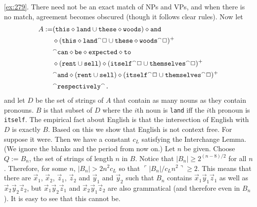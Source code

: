 \eqref{ex:279}. There need not be an exact match of NPs and 
VPs, and when there is no match, agreement becomes obscured (though 
it follows clear rules). Now let 
\begin{align}
A := & (\mbox{\tt this}\diamond \mbox{\tt land} \cup \mbox{\tt these}
	\diamond \mbox{\tt woods})\diamond \mbox{\tt and} \\\notag
& \diamond (\mbox{\tt this}\diamond\mbox{\tt land}{^{\smallfrown}}\Box \cup 
	\mbox{\tt these}\diamond\mbox{\tt woods}{^{\smallfrown}}\Box)^+ \\\notag 
	& {^{\smallfrown}} \mbox{\tt can}\diamond\mbox{\tt be}\diamond\mbox{\tt expected}
	\diamond\mbox{\tt to} \\\notag
	& \diamond (\mbox{\tt rent} \cup \mbox{\tt sell})\diamond
	(\mbox{\tt itself}{^{\smallfrown}}\Box \cup 
	\mbox{\tt themselves}{^{\smallfrown}}\Box)^+ \\\notag
	& {^{\smallfrown}}\mbox{\tt and} \diamond 
	(\mbox{\tt rent} \cup \mbox{\tt sell}) \diamond
	(\mbox{\tt itself}{^{\smallfrown}}\Box \cup \mbox{\tt themselves}{^{\smallfrown}}\Box)^+ 
	\\\notag
	& {^{\smallfrown}}\mbox{\tt respectively}{^{\smallfrown}}\mbox{\tt .}
\end{align}
and let $D$ be the set of strings of $A$ that contain as many nouns 
as they contain pronouns. $B$ is that subset of $D$ where the $i$th 
noun is {\tt land} iff the $i$th pronoun is {\tt itself}. The empirical 
fact about English is that the intersection of English with $D$ is exactly 
$B$. Based on this we show that English is not context free. For suppose 
it were. Then 
we have a constant $c_L$ satisfying the Interchange Lemma. (We ignore 
the blanks and the period from now on.) Let $n$ be given. Choose 
$Q := B_n$, the set of strings of length $n$ in $B$. Notice that 
$|B_n| \geq 2^{(n - 8)/2}$ for all $n$. Therefore, for some $n$, 
$|B_n| > 2 n^2 c_L$ so that $\ulcorner |B_n|/c_L n^2\urcorner \geq 2$. 
This means that there are $\vec{x}_1$, $\vec{x}_2$, $\vec{z}_1$, 
$\vec{z}_2$ and $\vec{y}_1$ and $\vec{y}_2$ such that $B_n$ contains 
$\vec{x}_1\vec{y}_1\vec{z}_1$ as well as $\vec{x}_2\vec{y}_2\vec{z}_2$, 
but $\vec{x}_1\vec{y}_2\vec{z}_1$ and $\vec{x}_2\vec{y}_1\vec{z}_2$ 
are also grammatical (and therefore even in $B_n$). It is easy to see 
that this cannot be.

